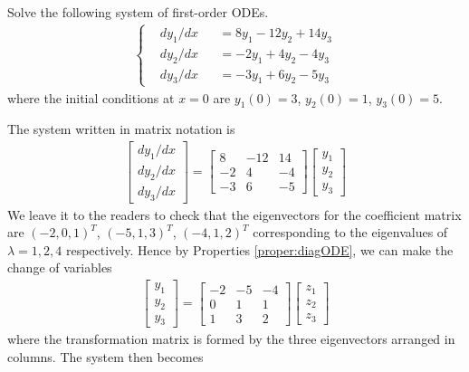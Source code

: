 \begin{exmp}
Solve the following system of first-order ODEs.
\begin{align*}
\left\{\begin{alignedat}{2}
& dy_1/dx & &= 8y_1 - 12y_2 + 14y_3 \\
& dy_2/dx & &= -2y_1 + 4y_2 - 4y_3 \\
& dy_3/dx & &= -3y_1 + 6y_2 - 5y_3 
\end{alignedat}\right.    
\end{align*}
where the initial conditions at $x=0$ are $y_1(0) = 3$, $y_2(0) = 1$, $y_3(0) = 5$.
\end{exmp}
\begin{solution}
The system written in matrix notation is
\begin{align*}
\begin{bmatrix}
dy_1/dx \\
dy_2/dx \\
dy_3/dx
\end{bmatrix}
=
\begin{bmatrix}
8 & -12 & 14 \\
-2 & 4 & -4 \\
-3 & 6 & -5
\end{bmatrix}
\begin{bmatrix}
y_1 \\
y_2 \\
y_3
\end{bmatrix}
\end{align*}
We leave it to the readers to check that the eigenvectors for the coefficient matrix are $(-2,0,1)^T$, $(-5,1,3)^T$, $(-4,1,2)^T$ corresponding to the eigenvalues of $\lambda = 1, 2, 4$ respectively. Hence by Properties \ref{proper:diagODE}, we can make the change of variables
\begin{align*}
\begin{bmatrix}
y_1 \\
y_2 \\
y_3
\end{bmatrix}
=
\begin{bmatrix}
-2 & -5 & -4 \\
0 & 1 & 1 \\
1 & 3 & 2
\end{bmatrix}
\begin{bmatrix}
z_1 \\
z_2 \\
z_3
\end{bmatrix}
\end{align*}
where the transformation matrix is formed by the three eigenvectors arranged in columns. The system then becomes

\end{solution}
